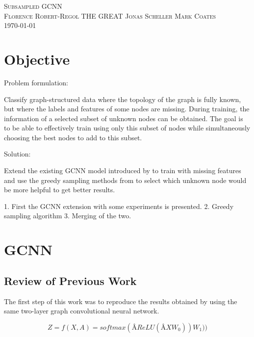 \documentclass{article}
\begin{document}

		
	\begin{center}

		\textsc{\huge Subsampled GCNN}\\[0.5cm] 
		\textsc{\large Florence Robert-Regol \hfill THE GREAT Jonas Scheller  \hfill Mark Coates}\\
		\textsc{\today}\\[0.5cm] 
		
	\end{center}


\pagestyle{fancy}
\rhead{\today}

\section*{Objective}
Problem formulation:

Classify graph-structured data where the topology of the graph is fully known, but where the labels and features of some nodes are missing. During training, the information of a selected subset of unknown nodes can be obtained. The goal is to be able to effectively train using only this subset of nodes while simultaneously choosing the best nodes to add to this subset.

Solution:

Extend the existing GCNN model introduced by \citet{kipf2017semi}
 to train with missing features
and use the greedy sampling methods from \citet{DBLP:journals/corr/ChamonR17}
 to select which unknown node would be more helpful to get better results. \
 
1. First the GCNN extension with some experiments is presented. 
2. Greedy sampling algorithm  
3. Merging of the two.

\section*{GCNN}
\subsection*{Review of Previous Work}
The first step of this work was to reproduce the results obtained by \citet{kipf2017semi} using the same two-layer graph
convolutional neural network.

\begin{equation}
Z = f(X, A) = softmax(\text{\^{A}} ReLU(\text{\^{A}}XW_0))W_1))
\end{equation}
\end{document}
